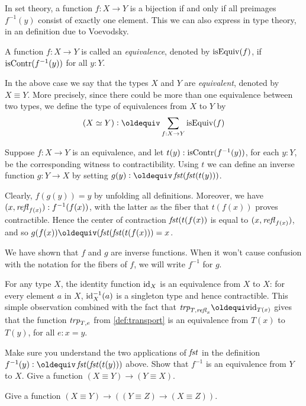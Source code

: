 In set theory, a function $f : X \to Y$ is a bijection if and only if
all preimages $f^{-1}(y)$ consist of exactly one element.
This we can also express in type theory, in an definition due
to Voevodsky. 

\begin{definition}
  \label{def:equivalence}
  A function $f : X \to Y$ is called an \emph{equivalence},
  denoted by $\mathrm{isEquiv}(f)$, if $\mathrm{isContr}(f^{-1}(y))$ for all $y:Y$.
\end{definition}

In the above case we say that the types
$X$ and $Y$ are \emph{equivalent}, denoted by $X\equiv Y$. 
More precisely, since there could be more than one equivalence
between two types, we define the type of equivalences from $X$ to $Y$ by
\[
(X\equiv Y) \defeq \sum_{f:X\to Y} \isEq(f) 
\]

Suppose $f:X \to Y$ is an equivalence, and let $t(y): \mathrm{isContr}(f^{-1}(y))$, for each $y:Y$, be the corresponding witness to contractibility.
Using $t$ we can define an inverse function $g : Y \to X$ by setting $g(y)\defeq\fst(\fst(t(y)))$.

Clearly, $f(g(y)) = y$ by unfolding all definitions.
Moreover, we have $(x,\mathop{{\it refl}_{f(x)}}) : f^{-1}(f(x))$,
with the latter as the fiber that $t(f(x))$
proves contractible. Hence the center of contraction
$\mathop{\mathit{fst}}(t(f(x))$ is equal to $(x,\mathop{{\it refl}_{f(x)}})$, and so
$g(f(x))\jdeq(\fst(\fst(t(f(x))) = x$.

We have shown that $f$ and $g$ are inverse functions.  When it won't cause confusion with the notation for the fibers of $f$, we will write
$f^{-1}$ for $g$.

For any type $X$, the identity function $\mathord{\mathrm{id}}_X$ is an
equivalence from $X$ to $X$: for every element $a$ in $X$,
$\mathord{\mathrm{id}}_X^{-1}(a)$ is a singleton type and hence contractible.
This simple observation combined with the fact that
$\trp_{T,\refl{x}}\jdeq \id_{T(x)}$ gives that
the function $\mathord{\mathit{trp}}_{T,e}$ from \cref{def:transport}
is an equivalence from $T(x)$ to $T(y)$, for all $e: x=y$.

\begin{xca}\label{xca:equivalence-invers}
Make sure you understand the two applications of $\mathop{\mathit{fst}}$
in the definition $f^{-1}(y)\defeq\fst(\fst(t(y)))$ above.
Show that $f^{-1}$ is an equivalence from $Y$ to $X$.
Give a function $(X\equiv Y) \to (Y\equiv X)$.
\end{xca}

\begin{xca}\label{xca:equivalence-comp}
Give  a function $(X\equiv Y) \to ((Y\equiv Z) \to (X\equiv Z))$.
\end{xca}

